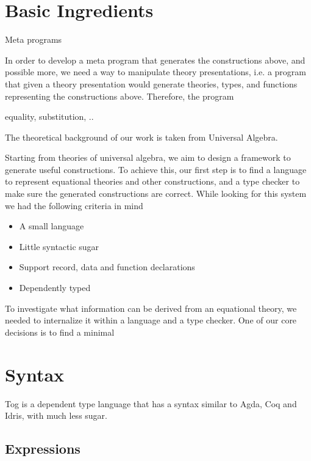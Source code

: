 \section{Basic Ingredients}

Meta programs 

In order to develop a meta program that generates the constructions above, and possible more, we need a way to manipulate theory presentations, i.e. a program that given a theory presentation would generate theories, types, and functions representing the constructions above. Therefore, the program 


equality, substitution, .. 

The theoretical background of our work is taken from Universal Algebra. 

Starting from theories of universal algebra, we aim to design a framework to generate useful constructions. To achieve this, our first step is to find a language to represent equational theories and other constructions, and a type checker to make sure the generated constructions are correct. While looking for this system we had the following criteria in mind 

\begin{itemize}
 \item A small language 
 \item Little syntactic sugar 
 \item Support record, data and function declarations 
 \item Dependently typed 
\end{itemize}


To investigate what information can be derived from an equational theory, we needed to internalize it within a language and a type checker. One of our core decisions is to find a minimal

\section{Syntax}
Tog is a dependent type language that has a syntax similar to Agda, Coq and Idris, with much less sugar. 
\subsection{Expressions}
